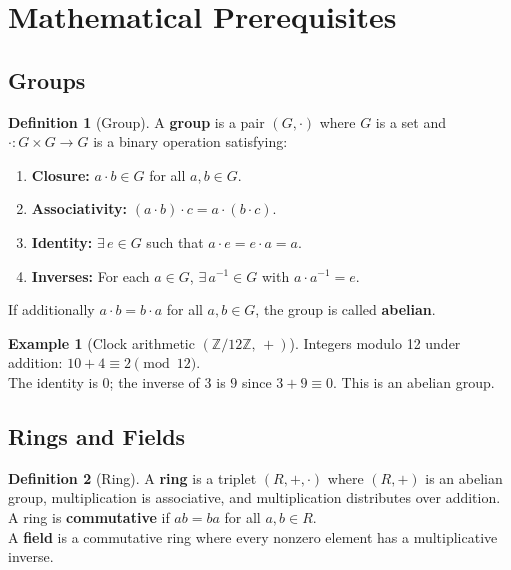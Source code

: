 \documentclass[12pt, a4paper]{article}
\theoremstyle{definition}
\newtheorem{definition}{Definition}[section]
\newtheorem{example}{Example}[section]
\theoremstyle{plain}
\newcommand{\Z}{\mathbb{Z}}
\begin{document}
\section{Mathematical Prerequisites}

\subsection{Groups}

\begin{definition}[Group]
    A \textbf{group} is a pair $(G, \cdot)$ where $G$ is a set and
    $\cdot : G \times G \to G$ is a binary operation satisfying:
    \begin{enumerate}
        \item \textbf{Closure:} $a \cdot b \in G$ for all $a, b \in G$.
        \item \textbf{Associativity:} $(a \cdot b) \cdot c = a \cdot (b \cdot c)$.
        \item \textbf{Identity:} $\exists\, e \in G$ such that $a \cdot e = e \cdot a = a$.
        \item \textbf{Inverses:} For each $a \in G$, $\exists\, a^{-1} \in G$
              with $a \cdot a^{-1} = e$.
    \end{enumerate}
    If additionally $a \cdot b = b \cdot a$ for all $a, b \in G$, the group is
    called \textbf{abelian}.
\end{definition}

\begin{example}[Clock arithmetic $(\Z/12\Z,\, +)$]
    Integers modulo 12 under addition: $10 + 4 \equiv 2 \pmod{12}$.\\
    The identity is $0$; the inverse of $3$ is $9$ since $3 + 9 \equiv 0$.
    This is an abelian group.
\end{example}

\subsection{Rings and Fields}

\begin{definition}[Ring]
    A \textbf{ring} is a triplet $(R, +, \cdot)$ where $(R, +)$ is an abelian group, multiplication is associative, and multiplication distributes over addition. A ring is \textbf{commutative} if $ab = ba$ for all $a, b \in R$.\\
    
    A \textbf{field} is a commutative ring where every nonzero element has a multiplicative inverse.
\end{definition}
\end{document}
